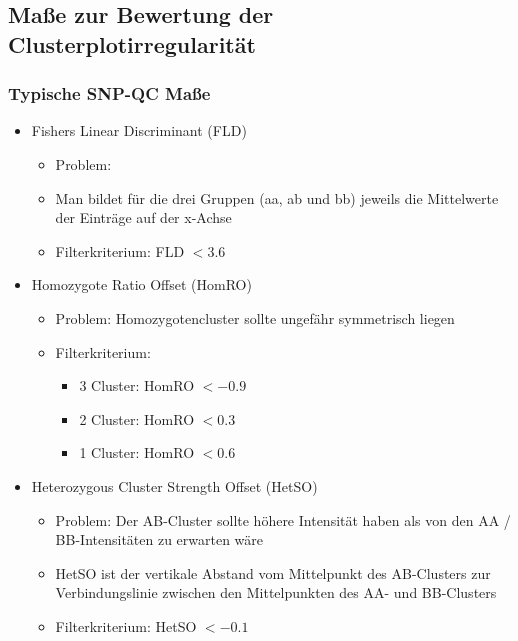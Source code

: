 \subsection{Maße zur Bewertung der Clusterplotirregularität}
\subsubsection{Typische SNP-QC Maße}
\begin{itemize}
	\item Fishers Linear Discriminant (FLD)
	\begin{itemize}
		\item Problem: 
		\item Man bildet für die drei Gruppen (aa, ab und bb) jeweils die Mittelwerte der Einträge auf der x-Achse
		\item Filterkriterium: FLD $<3.6$
	\end{itemize}
	\item Homozygote Ratio Offset (HomRO)
	\begin{itemize}
		\item Problem: Homozygotencluster sollte ungefähr symmetrisch liegen
		\item Filterkriterium:
		\begin{itemize}
			\item 3 Cluster: HomRO $<-0.9$
			\item 2 Cluster: HomRO $<0.3$
			\item 1 Cluster: HomRO $<0.6$
		\end{itemize}
	\end{itemize}
	\item Heterozygous Cluster Strength Offset (HetSO)
	\begin{itemize}
		\item Problem: Der AB-Cluster sollte höhere Intensität haben als von den AA / BB-Intensitäten zu erwarten wäre
		\item HetSO ist der vertikale Abstand vom Mittelpunkt des AB-Clusters zur Verbindungslinie zwischen den Mittelpunkten des AA- und BB-Clusters
		\item Filterkriterium: HetSO $<-0.1$
	\end{itemize}
\end{itemize}

